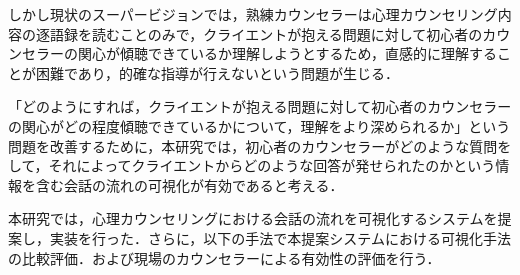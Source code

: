 \documentclass[shuuron]{kuee}
\begin{document}

しかし現状のスーパービジョンでは，熟練カウンセラーは心理カウンセリング内容の逐語録を読むことのみで，クライエントが抱える問題に対して初心者のカウンセラーの関心が傾聴できているか理解しようとするため，直感的に理解することが困難であり，的確な指導が行えないという問題が生じる．








「どのようにすれば，クライエントが抱える問題に対して初心者のカウンセラーの関心がどの程度傾聴できているかについて，理解をより深められるか」という問題を改善するために，本研究では，初心者のカウンセラーがどのような質問をして，それによってクライエントからどのような回答が発せられたのかという情報を含む会話の流れの可視化が有効であると考える．%

本研究では，心理カウンセリングにおける会話の流れを可視化するシステムを提案し，実装を行った．さらに，以下の手法で本提案システムにおける可視化手法の比較評価．および現場のカウンセラーによる有効性の評価を行う．
\end{document}

